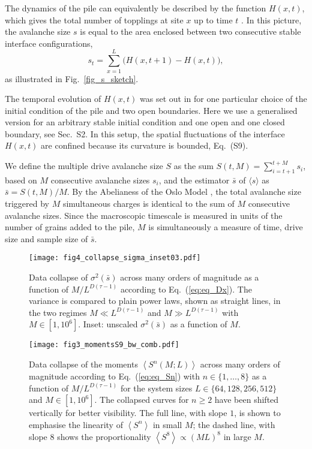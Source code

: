 \documentclass[doublecol]{epl2}
\newcommand{\elabel}[1]{\label{eq:#1}}
\newcommand{\Eref}[1]{Eq.~(\ref{eq:#1})}
\newcommand{\Figref}[1]{Fig.~\ref{fig_#1}}
\newcommand{\bungledXR}[2]{#2}
\newcommand{\wasrevised}[1]{#1}
\begin{document}
The dynamics of the pile can equivalently be described by the function $H(x,t)$, which gives the total number of topplings at site $x$ up to time $t$ \cite{PhysRevLett.77.111, pruessner2003oslo}. In this picture, the avalanche size $s$ is equal to the area enclosed between two consecutive stable interface configurations,
\begin{equation}
s_t=\sum_{x=1}^L\big(H(x,t+1)-H(x,t)\big),
\elabel{eq_s_H}
\end{equation}
 as illustrated in \Figref{s_sketch}.
 
The temporal evolution of $H(x,t)$ was set out in \cite{pruessner2003oslo} for one particular choice of the initial condition of the pile and two open boundaries. Here we use a generalised version for an arbitrary stable initial condition and one open and one closed boundary, see \bungledXR{\ref{sect_app_interface}}{Sec.~S2}. In this setup, the spatial fluctuations of the interface $H(x,t)$ are confined because its curvature is bounded, \bungledXR{}{Eq.~(S9)}.
  
We define the multiple drive avalanche size $S$ as the sum $S(t,M)=\sum_{i=t+1}^{t+{M}} s_i $, 
based on $M$ consecutive avalanche sizes $s_i$,
and the estimator $\bar{s}$ of $\langle s \rangle$ as $\bar{s} = S(t,M)/M$. By the Abelianess of the Oslo Model \cite{dhar2004steady}, the total avalanche size triggered by $M$ simultaneous charges is identical to the sum of $M$ consecutive avalanche sizes. Since the macroscopic timescale is measured in units of the number of grains added to the pile, $M$ is simultaneously a measure of time, drive size and sample size of $\bar{s}$.

\begin{figure}
 \texttt{[image: fig4\_collapse\_sigma\_inset03.pdf]}
 \caption{ \label{fig_Dx} Data collapse of $\sigma^2\left(\bar{s}\right)$ \wasrevised{across many orders of magnitude} as a function of $M/L^{D(\tau-1)}$ according to \Eref{eq_Dx}. The variance is compared to plain power laws, shown as straight lines, in the two regimes $M\ll L^{D(\tau-1)}$ and  $M\gg L^{D(\tau-1)}$ with $M\in\left[1,10^6\right]$. Inset: unscaled $\sigma^2\left(\bar{s}\right)$ as a function of $M$.} 
 \end{figure}
 
 \begin{figure}
 \texttt{[image: fig3\_momentsS9\_bw\_comb.pdf]}
\caption{ \label{fig_Sn1} Data collapse of the moments $\left\langle S^n(M;L)\right\rangle$ \wasrevised{across many orders of magnitude} according to \Eref{eq_Sn} with $n\in\{1,\ldots,8\}$ as a function of $M/L^{D(\tau-1)}$ for the system sizes $L\in\{64,128, 256, 512\}$ and $M\in\left[1,10^6\right]$.  \wasrevised{The collapsed curves for $n\geq2$ have been shifted vertically for better visibility.} The full line, with slope $1$, is shown to emphasise the linearity of $\left\langle S^n\right\rangle$ in small $M$; the dashed line, with slope $8$ shows the proportionality $\left\langle S^8\right\rangle\propto(ML)^8$ in large $M$.}
\end{figure}
\end{document}
